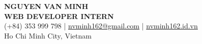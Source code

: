 \begin{center}
    {\fontsize{25}{28}\selectfont\bfseries NGUYEN VAN MINH}\\[4pt]
    {\large\bfseries WEB DEVELOPER INTERN}\\[6pt]
    (+84) 353 999 798 \;|\; \href{mailto:nvminh162@gmail.com}{nvminh162@gmail.com} \;|\; \href{https://nvminh162.id.vn}{nvminh162.id.vn}\\[3pt]
    Ho Chi Minh City, Vietnam
    \\ \vspace{-1pt}
\end{center}
